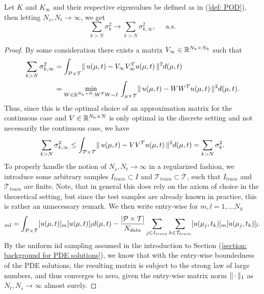 \begin{proposition} \label{prop: existence and convergence to sigma infty}
    Let $K$ and $K_\infty$ and their respective eigenvalues be defined as in (\ref{def: POD}), then letting $N_s, N_t \to \infty$, we get 
    \begin{equation*}
        \sum_{k > N} \sigma_k^2 \longrightarrow \sum_{k > N} \sigma_{k, \infty}^2, \quad \mbox{ a.s.}
    \end{equation*}
\end{proposition}
\begin{proof}

    
    By some consideration there exists a matrix $V_\infty \in \mathbb{R}^{N_h \times N_h}$ such that 
    \begin{align*}
        \sum_{k > N} \sigma^2_{k, \infty} &= \int_{\mathcal{P} \times \mathcal{T}} \lVert \, u(\mu, t) - V_\infty V^T_\infty u(\mu, t) \, \rVert^2 d(\mu, t) \\
        &= \underset{W \in \mathbb{R}^{N_h \times N}: W^T W = I}{\min} \, \int_{\mu \times \mathcal{T}} \lVert \, u(\mu, t) - W W^T u(\mu, t)  \, \rVert^2 d(\mu, t).
    \end{align*}
    Thus, since this is the optimal choice of an approximation matrix for the continuous case and $V \in \mathbb{R}^{N_h \times N}$ is only optimal in the discrete setting and not necessarily the continuous case, we have
    \begin{equation}
        \sum_{k > N} \sigma^2_{k, \infty} \leq \int_{\mathcal{P} \times \mathcal{T}} \lVert \, u(\mu, t) - V V^T u(\mu, t) \, \rVert^2 d(\mu, t) = \sum_{k > N} \sigma^2_k.
    \end{equation}
    To properly handle the notion of $N_s, N_t \to \infty$ in a regularized fashion, we introduce some arbitrary samples $I_{train} \subset I$ and $\mathcal{T}_{train} \subset \mathcal{T}$, such that $I_{train}$ and $\mathcal{T}_{train}$ are finite. Note, that in general this does rely on the axiom of choice in the theoretical setting, but since the test samples are already known in practice, this is rather an unnecessary remark. We then write entry-wise for $m, l = 1, \dots N_h$
    \begin{equation*}
        [K_\infty - K]_{ml} = \int_{\Pcal \times \Tcal} [u(\mu, t)]_m [u(\mu, t)]_l d(\mu, t) - \frac{\vert \Pcal \times \Tcal \vert}{N_{data}} \sum_{j \in I_{train}} \sum_{k \in \Tcal_{train}} [u(\mu_j, t_k)]_m [u(\mu_j, t_k)]_l.
    \end{equation*}
    By the uniform iid sampling assumed in the introduction to Section (\ref{section: background for PDE solutions}), we know that with the entry-wise boundedness of the PDE solutions, the resulting matrix is subject to the strong law of large numbers, and thus converges to zero, given the entry-wise matrix norm $\lVert \,  \cdot  \, \rVert_1$ as $N_t, N_s \to \infty$ almost surely.
    

\end{proof}
